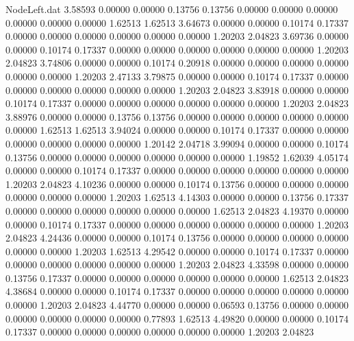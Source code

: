 \begin{filecontents}{NodeLeft.dat}
   3.58593    0.00000    0.00000     0.13756    0.13756    0.00000    0.00000    0.00000    0.00000    0.00000    0.00000    1.62513    1.62513
   3.64673    0.00000    0.00000     0.10174    0.17337    0.00000    0.00000    0.00000    0.00000    0.00000    0.00000    1.20203    2.04823
   3.69736    0.00000    0.00000     0.10174    0.17337    0.00000    0.00000    0.00000    0.00000    0.00000    0.00000    1.20203    2.04823
   3.74806    0.00000    0.00000     0.10174    0.20918    0.00000    0.00000    0.00000    0.00000    0.00000    0.00000    1.20203    2.47133
   3.79875    0.00000    0.00000     0.10174    0.17337    0.00000    0.00000    0.00000    0.00000    0.00000    0.00000    1.20203    2.04823
   3.83918    0.00000    0.00000     0.10174    0.17337    0.00000    0.00000    0.00000    0.00000    0.00000    0.00000    1.20203    2.04823
   3.88976    0.00000    0.00000     0.13756    0.13756    0.00000    0.00000    0.00000    0.00000    0.00000    0.00000    1.62513    1.62513
   3.94024    0.00000    0.00000     0.10174    0.17337    0.00000    0.00000    0.00000    0.00000    0.00000    0.00000    1.20142    2.04718
   3.99094    0.00000    0.00000     0.10174    0.13756    0.00000    0.00000    0.00000    0.00000    0.00000    0.00000    1.19852    1.62039
   4.05174    0.00000    0.00000     0.10174    0.17337    0.00000    0.00000    0.00000    0.00000    0.00000    0.00000    1.20203    2.04823
   4.10236    0.00000    0.00000     0.10174    0.13756    0.00000    0.00000    0.00000    0.00000    0.00000    0.00000    1.20203    1.62513
   4.14303    0.00000    0.00000     0.13756    0.17337    0.00000    0.00000    0.00000    0.00000    0.00000    0.00000    1.62513    2.04823
   4.19370    0.00000    0.00000     0.10174    0.17337    0.00000    0.00000    0.00000    0.00000    0.00000    0.00000    1.20203    2.04823
   4.24436    0.00000    0.00000     0.10174    0.13756    0.00000    0.00000    0.00000    0.00000    0.00000    0.00000    1.20203    1.62513
   4.29542    0.00000    0.00000     0.10174    0.17337    0.00000    0.00000    0.00000    0.00000    0.00000    0.00000    1.20203    2.04823
   4.33598    0.00000    0.00000     0.13756    0.17337    0.00000    0.00000    0.00000    0.00000    0.00000    0.00000    1.62513    2.04823
   4.38684    0.00000    0.00000     0.10174    0.17337    0.00000    0.00000    0.00000    0.00000    0.00000    0.00000    1.20203    2.04823
   4.44770    0.00000    0.00000     0.06593    0.13756    0.00000    0.00000    0.00000    0.00000    0.00000    0.00000    0.77893    1.62513
   4.49820    0.00000    0.00000     0.10174    0.17337    0.00000    0.00000    0.00000    0.00000    0.00000    0.00000    1.20203    2.04823

\end{filecontents}
